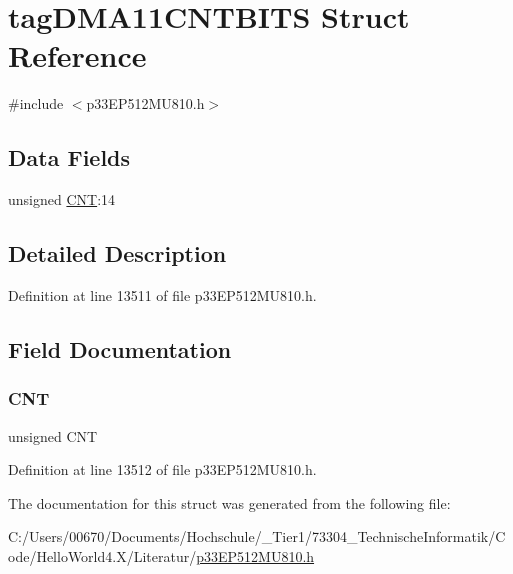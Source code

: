 \hypertarget{structtag_d_m_a11_c_n_t_b_i_t_s}{}\section{tag\+D\+M\+A11\+C\+N\+T\+B\+I\+TS Struct Reference}
\label{structtag_d_m_a11_c_n_t_b_i_t_s}


{\ttfamily \#include $<$p33\+E\+P512\+M\+U810.\+h$>$}

\subsection*{Data Fields}
\begin{DoxyCompactItemize}
\item 
unsigned \hyperlink{structtag_d_m_a11_c_n_t_b_i_t_s_a30be39d82c244f19fd98dd74227487f6}{C\+NT}\+:14
\end{DoxyCompactItemize}


\subsection{Detailed Description}


Definition at line 13511 of file p33\+E\+P512\+M\+U810.\+h.



\subsection{Field Documentation}
\mbox{\label{structtag_d_m_a11_c_n_t_b_i_t_s_a30be39d82c244f19fd98dd74227487f6}} 
\subsubsection{\texorpdfstring{C\+NT}{CNT}}
{\footnotesize\ttfamily unsigned C\+NT}



Definition at line 13512 of file p33\+E\+P512\+M\+U810.\+h.



The documentation for this struct was generated from the following file\+:\begin{DoxyCompactItemize}
\item 
C\+:/\+Users/00670/\+Documents/\+Hochschule/\+\_\+\+Tier1/73304\+\_\+\+Technische\+Informatik/\+Code/\+Hello\+World4.\+X/\+Literatur/\hyperlink{p33_e_p512_m_u810_8h}{p33\+E\+P512\+M\+U810.\+h}\end{DoxyCompactItemize}
